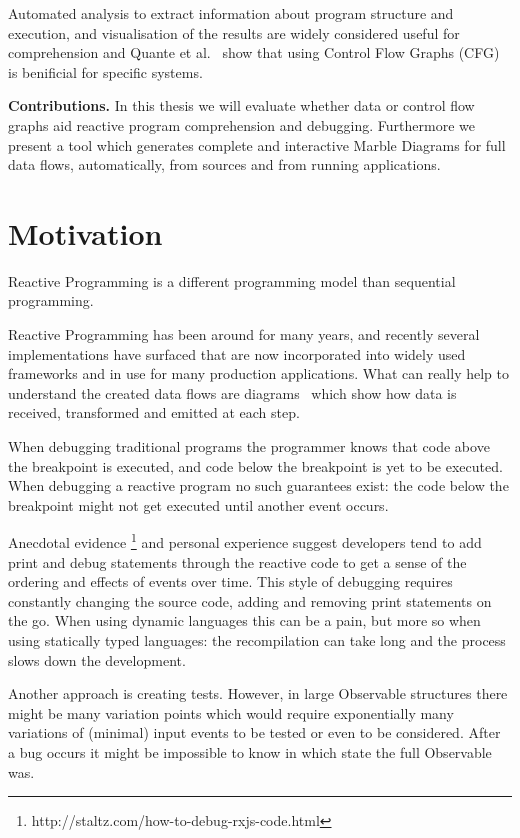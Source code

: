 Automated analysis to extract information about program structure and
execution, and visualisation of the results are widely considered useful
for comprehension and Quante et al.~\cite{quante2008dynamic} show that
using Control Flow Graphs (CFG) is benificial for specific systems.

\textbf{Contributions.} In this thesis we will evaluate whether data or
control flow graphs aid reactive program comprehension and debugging.
Furthermore we present a tool which generates complete and interactive
Marble Diagrams for full data flows, automatically, from sources and
from running applications.

\section{Motivation}%
\label{sec:motiv} Reactive Programming is a different programming model
than sequential programming.

Reactive Programming has been around for many years, and recently
several implementations have surfaced that are now incorporated into
widely used frameworks and in use for many production applications. What
can really help to understand the created data flows are diagrams~\cite
{weck2016visualizing} which show how data is received, transformed and
emitted at each step.

When debugging traditional programs the programmer knows that code above
the breakpoint is executed, and code below the breakpoint is yet to be
executed.  When debugging a reactive program no such guarantees exist:
the code below the breakpoint might not get executed until another event
occurs.

Anecdotal evidence%
\footnote{http://staltz.com/how-to-debug-rxjs-code.html} and personal
experience suggest developers tend to add print and debug statements
through the reactive code to get a sense of the ordering and effects of
events over time.  This style of debugging requires constantly changing
the source code, adding and removing print statements on the go.  When
using dynamic languages this can be a pain, but more so when using
statically typed languages:  the recompilation can take long and the
process slows down the development.

Another approach is creating tests.  However, in large Observable
structures there might be many variation points which would require
exponentially many variations of (minimal) input events to be tested or
even to be considered.  After a bug occurs it might be impossible to
know in which state the full Observable was.

